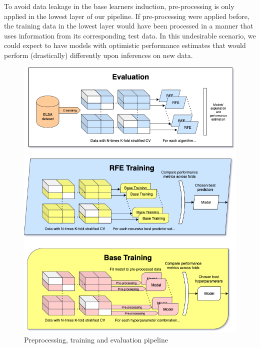 To avoid data leakage in the base learners induction, pre-processing is only applied in the lowest layer of our pipeline.
If pre-processing were applied before, the training data in the lowest layer would have been processed in a manner that uses information from its corresponding test data.
In this undesirable scenario, we could expect to have models with optimistic performance estimates that would perform (drastically) differently upon inferences on new data.

\begin{figure}[]
    \caption{Preprocessing, training and evaluation pipeline}
    \centerline{\includegraphics[scale=.6]{fig_pipeline_diagram}}
    \label{fig:train-pipeline}
\end{figure}

